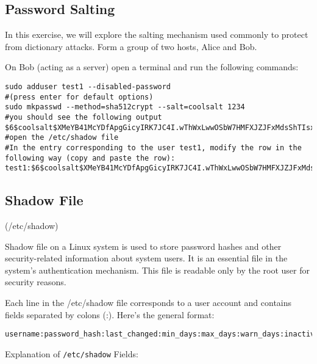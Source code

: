 \subsection{Password Salting}
In this exercise, we will explore the salting mechanism used commonly to protect from dictionary attacks. Form a group of two hosts, Alice and Bob.

On Bob (acting as a server) open a terminal and run the following commands:
\begin{lstlisting}[style=bashStyle]
sudo adduser test1 --disabled-password 
#(press enter for default options)
sudo mkpasswd --method=sha512crypt --salt=coolsalt 1234
#you should see the following output
$6$coolsalt$XMeYB41McYDfApgGicyIRK7JC4I.wThWxLwwOSbW7HMFXJZJFxMdsShTIsxoiy/yG2BKqqDIRH2Aasf/XDWks/
#open the /etc/shadow file
#In the entry corresponding to the user test1, modify the row in the following way (copy and paste the row):
test1:$6$coolsalt$XMeYB41McYDfApgGicyIRK7JC4I.wThWxLwwOSbW7HMFXJZJFxMdsShTIsxoiy/yG2BKqqDIRH2Aasf/XDWks/:19674:0:99999:7:::
\end{lstlisting}

\subsection*{Shadow File}
\begin{center}
    (/etc/shadow)
\end{center}
Shadow file on a Linux system is used to store password hashes and other security-related information about system users. It is an essential file in the system’s authentication mechanism. This file is readable only by the root user for security reasons.

    Each line in the /etc/shadow file corresponds to a user account and contains fields separated by colons (:). Here’s the general format:
    \begin{lstlisting}[style=bashStyle]
username:password_hash:last_changed:min_days:max_days:warn_days:inactive_days:expire_date:reserved
    \end{lstlisting}


Explanation of \texttt{/etc/shadow} Fields:

